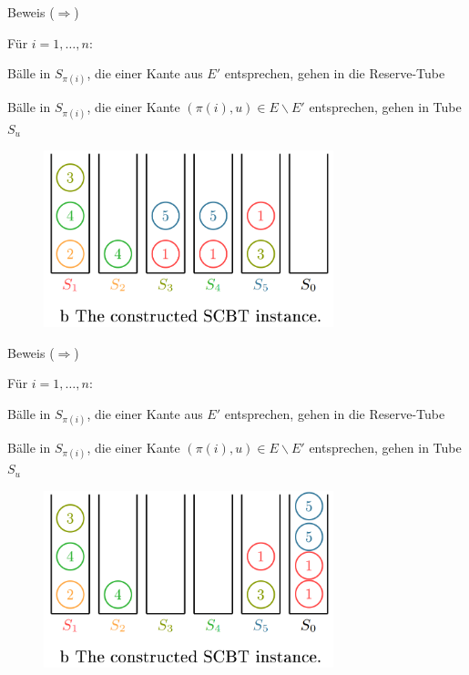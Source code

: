 \documentclass{beamer}
\begin{document}
\begin{frame}{Beweis (\glqq $\Rightarrow$\grqq)}
\begin{pointlist}
\item Für $i=1,\dots,n$:
\begin{arrowlist}
\item Bälle in $S_{\pi(i)}$, die einer Kante aus $E'$ entsprechen, gehen in die Reserve-Tube 
\item Bälle in $S_{\pi(i)}$, die einer Kante $(\pi(i),u)\in E\backslash E'$ entsprechen, gehen in Tube $S_u$
\end{arrowlist}
\end{pointlist}
\begin{figure}
    \centering
    \includegraphics[width=0.75\textwidth]{constgraph}
\end{figure}
\end{frame}

\begin{frame}{Beweis (\glqq $\Rightarrow$\grqq)}
\begin{pointlist}
\item Für $i=1,\dots,n$:
\begin{arrowlist}
\item Bälle in $S_{\pi(i)}$, die einer Kante aus $E'$ entsprechen, gehen in die Reserve-Tube 
\item Bälle in $S_{\pi(i)}$, die einer Kante $(\pi(i),u)\in E\backslash E'$ entsprechen, gehen in Tube $S_u$
\end{arrowlist}
\end{pointlist}
\begin{figure}
    \centering
    \includegraphics[width=0.75\textwidth]{proofr1}
\end{figure}
\end{frame}
\end{document}
